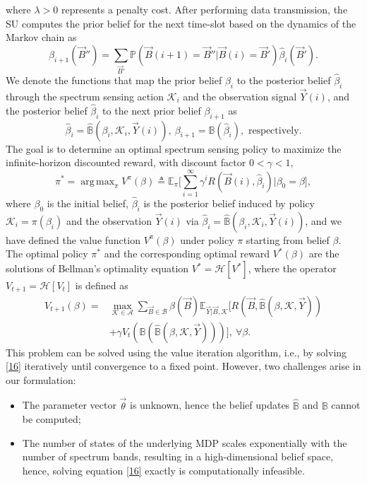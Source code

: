 \documentclass[10pt,twocolumn]{IEEEtran}
\DeclareMathOperator*{\argmax}{arg\,max}
\begin{document}
where $\lambda{>}0$ represents a penalty cost. After performing data transmission, the SU computes the prior belief for the next time-slot based on the dynamics of the Markov chain as
\begin{equation}\label{13}
    \beta_{i+1}(\vec{B}'')=\sum_{\vec{B}'}\mathbb{P}(\vec{B}(i+1) = \vec{B}''|\vec{B}(i)=\vec{B}')\hat{\beta}_{i}(\vec{B}').
\end{equation}
We denote the functions that map the prior belief $\beta_i$ to the posterior belief $\hat\beta_i$ through the spectrum sensing action $\mathcal K_i$ and the observation signal $\vec{Y}(i)$, and the posterior belief $\hat\beta_i$ to the next prior belief $\beta_{i+1}$ as
$$\hat\beta_i{=}\hat{\mathbb B}(\beta_i, \mathcal K_i, \vec{Y}(i)),\ \beta_{i+1}{=}{\mathbb B}(\hat\beta_i),\text{ respectively}.$$
The goal is to determine an optimal spectrum sensing policy to maximize the infinite-horizon discounted reward, with discount factor $0{<}\gamma{<}1$,
\begin{equation}\label{14}
    \pi^{*}{=}\argmax_{\pi} V^{\pi}(\beta) \triangleq \mathbb{E}_{\pi} \Big[\sum_{i=1}^{\infty} \gamma^{i} R(\vec{B}(i), \hat{\beta}_i)|\beta_0 {=}\beta\Big],
\end{equation}
where $\beta_0$ is the initial belief, $\hat\beta_i$ is the posterior belief induced by policy $\mathcal K_i{=}\pi(\beta_i)$ and the observation $\vec{Y}(i)$ via $\hat\beta_i{=}\hat{\mathbb B}(\beta_i, \mathcal K_i, \vec{Y}(i))$, and we have defined the value function $V^{\pi}(\beta)$ under policy $\pi$ starting from belief $\beta$.
The optimal policy $\pi^*$ and the corresponding optimal reward $V^*(\beta)$ are the solutions of Bellman's optimality equation $V^*{=}\mathcal{H}[V^*]$, where the operator $V_{t+1}{=}\mathcal {H}[V_{t}]$ is defined as
\begin{align}\label{16}
\nonumber
        V_{t+1}(\beta) = &\max_{\mathcal{K} {\in} \mathcal{A}} \sum_{\vec{B} {\in} \mathcal{B}} \beta(\vec{B}) \mathbb{E}_{\vec{Y}|\vec{B}, \mathcal{K}} \Big[R(\vec{B}, \hat{\mathbb{B}}(\beta, \mathcal{K}, \vec{Y}))\\ &+\gamma V_{t}(\mathbb{B}(\hat{\mathbb{B}}(\beta, \mathcal{K}, \vec{Y})))\Big],\ \forall \beta.
\end{align}
This problem can be solved using the value iteration algorithm, i.e., by solving \eqref{16} iteratively until convergence to a fixed point. However, two challenges arise in our formulation:
\begin{itemize}
\item The parameter vector $\vec{\theta}$ is unknown, hence the belief updates 
$\hat{\mathbb B}$ and $\mathbb B$ cannot be computed;
\item The number of states of the underlying MDP scales exponentially with the number of spectrum bands, resulting in a high-dimensional belief space, hence, solving equation \eqref{16} exactly is computationally infeasible.
\end{itemize}
\end{document}
